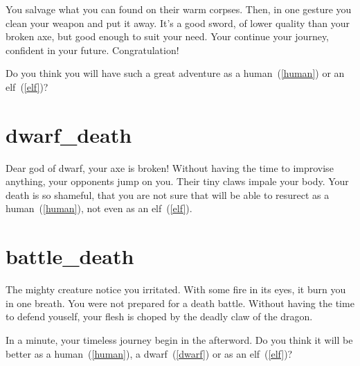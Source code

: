 You salvage what you can found on their warm corpses. Then, in one gesture you
clean your weapon and put it away. It's a good sword, of lower quality than your
broken axe, but good enough to suit your need. Your continue your journey,
confident in your future. Congratulation!

Do you think you will have such a great adventure as a human~(\ref{human}) or
an elf~(\ref{elf})?

\section{dwarf_death}

Dear god of dwarf, your axe is broken! Without having the time to improvise
anything, your opponents jump on you. Their tiny claws impale your body. Your
death is so shameful, that you are not sure that will be able to resurect as a
human~(\ref{human}), not even as an elf~(\ref{elf}).

\section{battle_death}

The mighty creature notice you irritated. With some fire in its eyes, it burn
you in one breath. You were not prepared for a death battle. Without having the
time to defend youself, your flesh is choped by the deadly claw of the dragon.

\medbreak

In a minute, your timeless journey begin in the afterword. Do you think it will
be better as a human~(\ref{human}), a dwarf~(\ref{dwarf}) or as an elf~(\ref{elf})?
